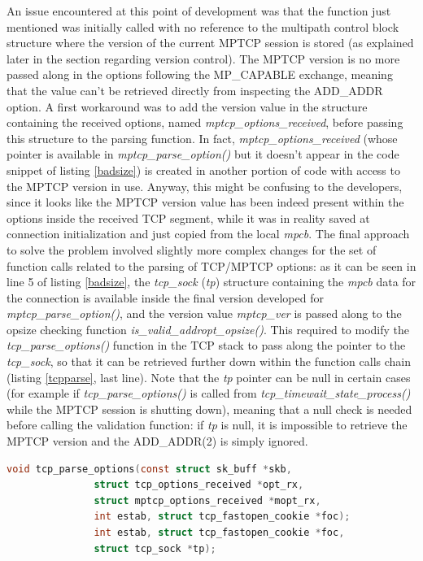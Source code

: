 An issue encountered at this point of development was that the function just mentioned was initially called with no reference to the multipath control block structure where the version of the current MPTCP session is stored (as explained later in the section regarding version control). The MPTCP version is no more passed along in the options following the MP\_CAPABLE exchange, meaning that the value can't be retrieved directly from inspecting the ADD\_ADDR option. A first workaround was to add the version value in the structure containing the received options, named \textit{mptcp\_options\_received}, before passing this structure to the parsing function. In fact, \textit{mptcp\_options\_received} (whose pointer is available in \textit{mptcp\_parse\_option()} but it doesn't appear in the code snippet of listing \ref{badsize}) is created in another portion of code with access to the MPTCP version in use. Anyway, this might be confusing to the developers, since it looks like the MPTCP version value has been indeed present within the options inside the received TCP segment, while it was in reality saved at connection initialization and just copied from the local \textit{mpcb}. The final approach to solve the problem involved slightly more complex changes for the set of function calls related to the parsing of TCP/MPTCP options: as it can be seen in line 5 of listing \ref{badsize}, the \textit{tcp\_sock} (\textit{tp}) structure containing the \textit{mpcb} data for the connection is available inside the final version developed for \textit{mptcp\_parse\_option()}, and the version value \textit{mptcp\_ver} is passed along to the opsize checking function \textit{is\_valid\_addropt\_opsize()}. This required to modify the \textit{tcp\_parse\_options()} function in the TCP stack to pass along the pointer to the \textit{tcp\_sock}, so that it can be retrieved further down within the function calls chain (listing \ref{tcpparse}, last line). Note that the \textit{tp} pointer can be null in certain cases (for example if \textit{tcp\_parse\_options()} is called from \textit{tcp\_timewait\_state\_process()} while the MPTCP session is shutting down), meaning that a null check is needed before calling the validation function: if \textit{tp} is null, it is impossible to retrieve the MPTCP version and the ADD\_ADDR(2) is simply ignored.

\begin{lstlisting}[language=c, caption=New definition for \textit{tcp\_parse\_options}, label=tcpparse]
void tcp_parse_options(const struct sk_buff *skb,
 		       struct tcp_options_received *opt_rx,
 		       struct mptcp_options_received *mopt_rx,
		       int estab, struct tcp_fastopen_cookie *foc);
		       int estab, struct tcp_fastopen_cookie *foc,
		       struct tcp_sock *tp);
\end{lstlisting}

